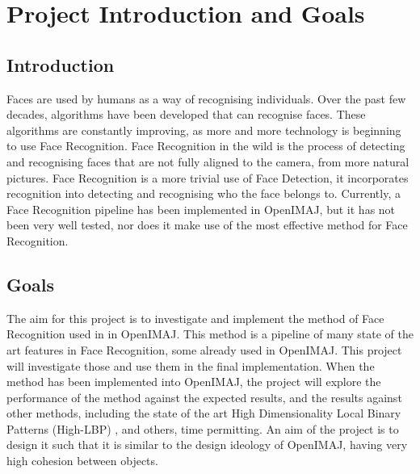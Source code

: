 \documentclass[12pt, a4paper]{article}
\begin{document}
        \newpage
       
 
 
       
        \tableofcontents
       
 
 
        \newpage
 \section{Project Introduction and Goals}
 \subsection{Introduction}
 Faces are used by humans as a way of recognising individuals. Over the past few decades, algorithms have been developed that can recognise faces. These algorithms are constantly improving, as more and more technology is beginning to use Face Recognition. Face Recognition in the wild is the process of detecting and recognising faces that are not fully aligned to the camera, from more natural pictures. Face Recognition is a more trivial use of Face Detection, it incorporates recognition into detecting and recognising who the face belongs to. Currently, a Face Recognition pipeline has been implemented in OpenIMAJ, but it has not been very well tested, nor does it make use of the most effective method for Face Recognition.

 \subsection{Goals}
The aim for this project is to investigate and implement the method of Face Recognition used in \cite{simonyan2004fisher} in OpenIMAJ. This method is a pipeline of many state of the art features in Face Recognition, some already used in OpenIMAJ. This project will investigate those and use them in the final implementation. When the method has been implemented into OpenIMAJ, the project will explore the performance of the method against the expected results, and the results against other methods, including the state of the art High Dimensionality Local Binary Patterns (High-LBP) \cite{highlbpsift}, and others, time permitting. An aim of the project is to design it such that it is similar to the design ideology of OpenIMAJ, having very high cohesion between objects.
\end{document}
